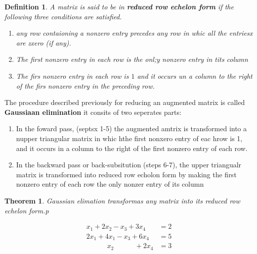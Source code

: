 \documentclass[10pt, oneside]{article}
\newtheorem{thm}{Theorem}
\newtheorem{defn}{Definition}
\begin{document}
\begin{defn}
	A matrix is said to be in \textbf{reduced row echelon form} if the following three conditions are satisfied.

	\begin{enumerate}
		\item any row contaioning a nonzero entry precedes any row in whic all the entriesx are zxero (if any).
		\item The first nonzero entry in each row is the onl;y nonzero entry in tits column
		\item The firs nonzero entry in each row is $1$ and it occurs un a column to the right of the firs nonzero entry in the preceding row.
	\end{enumerate}
\end{defn}

The procedure described previously for reducing an augmented matrix is called \textbf{Gaussiaan elimination} it consits of two seperates parts:

\begin{enumerate}
	\item In the foward pass, (septsx 1-5) the augmented amtrix is transformed into a nupper triangular matrix in whic hthe first nonxero entry of eac hrow is 1, and it occurs in a column to the right of
	      the first nonzero entry of each row.
	\item In the backward pass or back-subsitution (steps 6-7), the upper triangualr matrix is transformed into reduced row echolon form by making the first nonzero entry of each row the only nonzer
	      entry of its column
\end{enumerate}

\begin{thm}
	Gaussian elimation transformas any matrix into its reduced row echelon form.p
\end{thm}

\[
	\begin{array}{ll}
		x_1 + 2x_2 - x_3 + 3x_4                        & = 2 \\
		2x_1 + 4x_1 - x_3 + 6x_4                       & = 5 \\
		\quad \quad \quad x_2 \quad \quad \quad + 2x_4 & = 3
	\end{array}
\]
\end{document}
